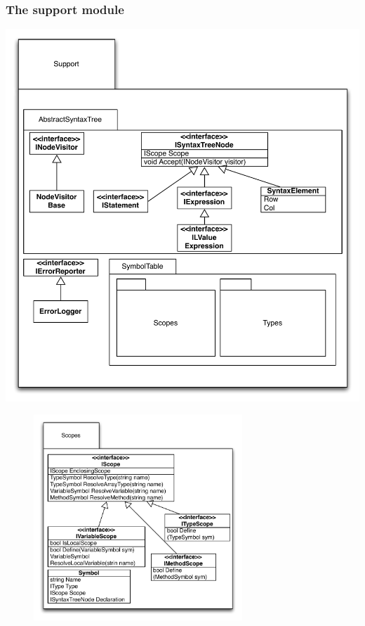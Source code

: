 \documentclass[a4paper,11pt]{article}
\begin{document}
\subsubsection{The support module}

\includegraphics[width=1.0\textwidth]{support.pdf}

\begin{figure}[h!]
\centering
\includegraphics[width=0.7\textwidth]{scopes.pdf}
\end{figure}
\end{document}
